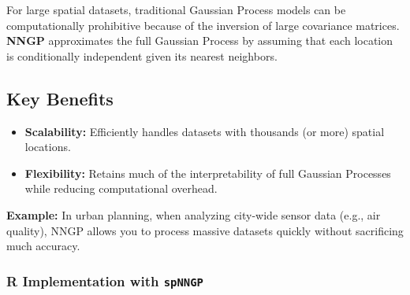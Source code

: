 \documentclass[
  11pt,
]{report}
\providecommand{\tightlist}{%
  \setlength{\itemsep}{0pt}\setlength{\parskip}{0pt}}\usepackage{longtable,booktabs,array}
\begin{document}
For large spatial datasets, traditional Gaussian Process models can be
computationally prohibitive because of the inversion of large covariance
matrices. \textbf{NNGP} approximates the full Gaussian Process by
assuming that each location is conditionally independent given its
nearest neighbors.

\subsection{Key Benefits}\label{key-benefits}

\begin{itemize}
\tightlist
\item
  \textbf{Scalability:} Efficiently handles datasets with thousands (or
  more) spatial locations.
\item
  \textbf{Flexibility:} Retains much of the interpretability of full
  Gaussian Processes while reducing computational overhead.
\end{itemize}

\textbf{Example:} In urban planning, when analyzing city-wide sensor
data (e.g., air quality), NNGP allows you to process massive datasets
quickly without sacrificing much accuracy.

\subsubsection{\texorpdfstring{R Implementation with
\texttt{spNNGP}}{R Implementation with spNNGP}}\label{r-implementation-with-spnngp}
\end{document}
